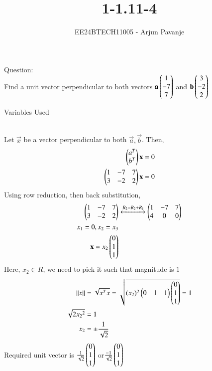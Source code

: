 \documentclass[journal]{IEEEtran}
\begin{document}

\vspace{3cm}

\title{1-1.11-4}
\author{EE24BTECH11005 - Arjun Pavanje
}
{\let\newpage\relax\maketitle}
Question:\\
Find a unit vector perpendicular to both vectors $\mathbf{a}\begin{pmatrix}1\\-7\\7\end{pmatrix}$ and $\mathbf{b}\begin{pmatrix}3\\-2\\2\end{pmatrix}$
\begin{table}[h!]    
  \centering
  
  \caption{Variables Used}
  \label{tab1-1.9-6}
\end{table}\\
\solution
Let $\vec{x}$ be a vector perpendicular to both $\vec{a},\vec{b}$. Then,
\begin{align}
	\begin{pmatrix}a^T\\b^T\end{pmatrix}\mathbf{x}=0\\
	\begin{pmatrix}1&-7&7\\3&-2&2\end{pmatrix}\mathbf{x}=0
\end{align}
Using row reduction, then back substitution,
\begin{align}
	\begin{pmatrix}1&-7&7\\3&-2&2\end{pmatrix}&\xleftrightarrow[]{R_2=R_2+R_1}\begin{pmatrix}1&-7&7\\4&0&0\end{pmatrix}\\
	x_1=0, x_2=x_3\\
	\mathbf{x}=x_2\begin{pmatrix}0\\1\\1\end{pmatrix}
\end{align}
Here, $x_2 \in R$, we need to pick it such that magnitude is $1$
\begin{align}
	\left\lVert x\right\rVert&=\sqrt{x^Tx}=\sqrt{(x_2)^2\begin{pmatrix}0&1&1\end{pmatrix}\begin{pmatrix}0\\1\\1\end{pmatrix}}=1\\
	\sqrt{2{x_2}^2}&=1\\
	x_2&=\pm \frac{1}{\sqrt{2}}
\end{align}
Required unit vector is $\frac{1}{\sqrt{2}}\begin{pmatrix}0\\1\\1\end{pmatrix}$ or$\frac{-1}{\sqrt{2}}\begin{pmatrix}0\\1\\1\end{pmatrix}$ 
\end{document}
